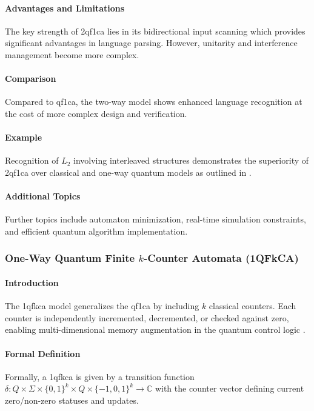 \paragraph{Advantages and Limitations}
The key strength of \gls{2qf1ca} lies in its bidirectional input scanning which provides significant advantages in language parsing. However, unitarity and interference management become more complex.

\paragraph{Comparison}
Compared to \gls{qf1ca}, the two-way model shows enhanced language recognition at the cost of more complex design and verification.

\paragraph{Example}
Recognition of $L_2$ involving interleaved structures demonstrates the superiority of \gls{2qf1ca} over classical and one-way quantum models as outlined in \cite{bonner2001quantum}.

\paragraph{Additional Topics}
Further topics include automaton minimization, real-time simulation constraints, and efficient quantum algorithm implementation.

\subsubsection{One-Way Quantum Finite $k$-Counter Automata (1QFkCA)}

\paragraph{Introduction}
The \gls{1qfkca} model generalizes the \gls{qf1ca} by including $k$ classical counters. Each counter is independently incremented, decremented, or checked against zero, enabling multi-dimensional memory augmentation in the quantum control logic \cite{cem2012quantum}.

\paragraph{Formal Definition}
Formally, a \gls{1qfkca} is given by a transition function $\delta: Q \times \Sigma \times \{0,1\}^k \times Q \times \{-1,0,1\}^k \rightarrow \mathbb{C}$ with the counter vector defining current zero/non-zero statuses and updates.

